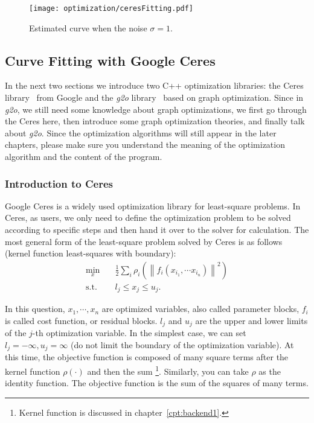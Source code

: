 \begin{figure}[!ht]
    \centering
    \texttt{[image: optimization/ceresFitting.pdf]}
    \caption{Estimated curve when the noise $\sigma=1$. }
    \label{fig:ceres-fitting}
\end{figure}

\subsection{Curve Fitting with Google Ceres}
In the next two sections we introduce two C++ optimization libraries: the Ceres library~\cite{Ceres} from Google and the \textit{g2o} library~\cite{Kummerle2011} based on graph optimization. Since in \textit{g2o}, we still need some knowledge about graph optimizations, we first go through the Ceres here, then introduce some graph optimization theories, and finally talk about \textit{g2o}. Since the optimization algorithms will still appear in the later chapters, please make sure you understand the meaning of the optimization algorithm and the content of the program.

\subsubsection{Introduction to Ceres}
Google Ceres is a widely used optimization library for least-square problems. In Ceres, as users, we only need to define the optimization problem to be solved according to specific steps and then hand it over to the solver for calculation. The most general form of the least-square problem solved by Ceres is as follows (kernel function least-squares with boundary):
\begin{equation}
    \begin{array}{ll}
        \min \limits_x \quad & \frac{1}{2}\sum\limits_i {{\rho _i}\left( {{{\left\| {{f_i}\left( {{x_{{i_1}}}, \cdots {x_{{i_n}}}} \right)} \right\|}^2}} \right)} \\
        \mathrm{s.t.} \quad & {l_j} \leqslant {x_j} \leqslant {u_j}.
    \end{array}
\end{equation}

In this question, $x_1, \cdots, x_n$ are optimized variables, also called parameter blocks, $f_i$ is called cost function, or residual blocks. $l_j$ and $u_j$ are the upper and lower limits of the $j$-th optimization variable. In the simplest case, we can set $l_j = -\infty, u_j=\infty$ (do not limit the boundary of the optimization variable). At this time, the objective function is composed of many square terms after the kernel function $\rho(\cdot)$ and then the sum \footnote{Kernel function is discussed in chapter~\ref{cpt:backend1}. }. Similarly, you can take $\rho$ as the identity function. The objective function is the sum of the squares of many terms.

